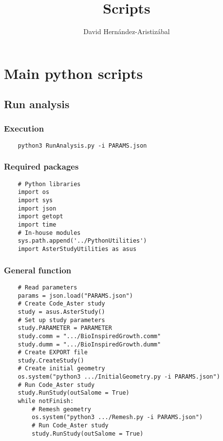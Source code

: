 \documentclass{article}
\title{Scripts}
\author{David Hernández-Aristizábal}
\begin{document}
\hypersetup{linkcolor = BlueHTML}

\maketitle
\tableofcontents

\section{Main python scripts}
\subsection{Run analysis}
\subsubsection{Execution}
\begin{verbatim}
    python3 RunAnalysis.py -i PARAMS.json
\end{verbatim}
\subsubsection{Required packages}
\begin{verbatim}
    # Python libraries
    import os
    import sys
    import json
    import getopt
    import time
    # In-house modules
    sys.path.append('../PythonUtilities')
    import AsterStudyUtilities as asus
\end{verbatim}
\subsubsection{General function}
\begin{verbatim}
    # Read parameters
    params = json.load("PARAMS.json")
    # Create Code_Aster study
    study = asus.AsterStudy()
    # Set up study parameters
    study.PARAMETER = PARAMETER
    study.comm = ".../BioInspiredGrowth.comm"
    study.dumm = ".../BioInspiredGrowth.dumm"
    # Create EXPORT file
    study.CreateStudy()
    # Create initial geometry
    os.system("python3 .../InitialGeometry.py -i PARAMS.json")
    # Run Code_Aster study
    study.RunStudy(outSalome = True)
    while notFinish:
        # Remesh geometry
        os.system("python3 .../Remesh.py -i PARAMS.json")
        # Run Code_Aster study
        study.RunStudy(outSalome = True)

\end{verbatim}
\end{document}
